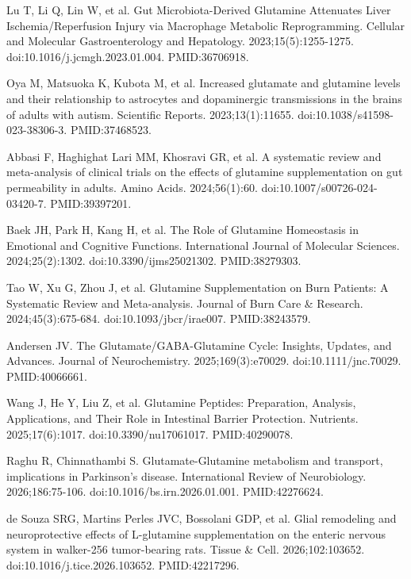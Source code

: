 \documentclass[12pt,oneside]{book}
\newcommand{\refend}{\endgroup\par}
\newcommand{\reff}[2]{\par\hangindent=7mm\hangafter=1\noindent[#1]\hspace{2mm}#2\par}
\begin{document}
\reff{30}{Lu T, Li Q, Lin W, et al. Gut Microbiota-Derived Glutamine Attenuates Liver Ischemia/Reperfusion Injury via Macrophage Metabolic Reprogramming. Cellular and Molecular Gastroenterology and Hepatology. 2023;15(5):1255-1275. doi:10.1016/j.jcmgh.2023.01.004. PMID:36706918.}

\reff{31}{Oya M, Matsuoka K, Kubota M, et al. Increased glutamate and glutamine levels and their relationship to astrocytes and dopaminergic transmissions in the brains of adults with autism. Scientific Reports. 2023;13(1):11655. doi:10.1038/s41598-023-38306-3. PMID:37468523.}

\reff{32}{Abbasi F, Haghighat Lari MM, Khosravi GR, et al. A systematic review and meta-analysis of clinical trials on the effects of glutamine supplementation on gut permeability in adults. Amino Acids. 2024;56(1):60. doi:10.1007/s00726-024-03420-7. PMID:39397201.}

\reff{33}{Baek JH, Park H, Kang H, et al. The Role of Glutamine Homeostasis in Emotional and Cognitive Functions. International Journal of Molecular Sciences. 2024;25(2):1302. doi:10.3390/ijms25021302. PMID:38279303.}

\reff{34}{Tao W, Xu G, Zhou J, et al. Glutamine Supplementation on Burn Patients: A Systematic Review and Meta-analysis. Journal of Burn Care \& Research. 2024;45(3):675-684. doi:10.1093/jbcr/irae007. PMID:38243579.}

\reff{35}{Andersen JV. The Glutamate/GABA-Glutamine Cycle: Insights, Updates, and Advances. Journal of Neurochemistry. 2025;169(3):e70029. doi:10.1111/jnc.70029. PMID:40066661.}

\reff{36}{Wang J, He Y, Liu Z, et al. Glutamine Peptides: Preparation, Analysis, Applications, and Their Role in Intestinal Barrier Protection. Nutrients. 2025;17(6):1017. doi:10.3390/nu17061017. PMID:40290078.}

\reff{37}{Raghu R, Chinnathambi S. Glutamate-Glutamine metabolism and transport, implications in Parkinson's disease. International Review of Neurobiology. 2026;186:75-106. doi:10.1016/bs.irn.2026.01.001. PMID:42276624.}

\reff{38}{de Souza SRG, Martins Perles JVC, Bossolani GDP, et al. Glial remodeling and neuroprotective effects of L-glutamine supplementation on the enteric nervous system in walker-256 tumor-bearing rats. Tissue \& Cell. 2026;102:103652. doi:10.1016/j.tice.2026.103652. PMID:42217296.}

\refend

\end{document}
